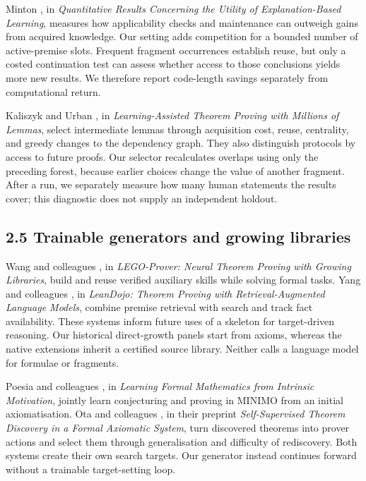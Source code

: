 \documentclass[pdflatex,sn-basic,Numbered]{sn-jnl}
\begin{document}
Minton \citep{Minton1990Utility}, in \emph{Quantitative Results Concerning the Utility of Explanation-Based Learning}, measures how applicability checks and maintenance can outweigh gains from acquired knowledge. Our setting adds competition for a bounded number of active-premise slots. Frequent fragment occurrences establish reuse, but only a costed continuation test can assess whether access to those conclusions yields more new results. We therefore report code-length savings separately from computational return.

Kaliszyk and Urban \citep{KaliszykUrban2015}, in \emph{Learning-Assisted Theorem Proving with Millions of Lemmas}, select intermediate lemmas through acquisition cost, reuse, centrality, and greedy changes to the dependency graph. They also distinguish protocols by access to future proofs. Our selector recalculates overlaps using only the preceding forest, because earlier choices change the value of another fragment. After a run, we separately measure how many human statements the results cover; this diagnostic does not supply an independent holdout.

\subsection*{2.5 Trainable generators and growing libraries}\label{trainable-generators-and-growing-libraries}

Wang and colleagues \citep{WangEtAl2023Lego}, in \emph{LEGO-Prover: Neural Theorem Proving with Growing Libraries}, build and reuse verified auxiliary skills while solving formal tasks. Yang and colleagues \citep{YangEtAl2023}, in \emph{LeanDojo: Theorem Proving with Retrieval-Augmented Language Models}, combine premise retrieval with search and track fact availability. These systems inform future uses of a skeleton for target-driven reasoning. Our historical direct-growth panels start from axioms, whereas the native extensions inherit a certified source library. Neither calls a language model for formulae or fragments.

Poesia and colleagues \citep{PoesiaEtAl2024}, in \emph{Learning Formal Mathematics from Intrinsic Motivation}, jointly learn conjecturing and proving in MINIMO from an initial axiomatisation. Ota and colleagues \citep{OtaEtAl2026}, in their preprint \emph{Self-Supervised Theorem Discovery in a Formal Axiomatic System}, turn discovered theorems into prover actions and select them through generalisation and difficulty of rediscovery. Both systems create their own search targets. Our generator instead continues forward without a trainable target-setting loop.
\end{document}
